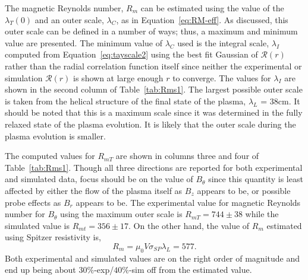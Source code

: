 \documentclass[aps,prl,amsmath,amssymb,reprint,superscriptaddress]{revtex4-1} %
\begin{document}
The magnetic Reynolds number, $R_{m}$ can be estimated using the value of the $\lambda_{T}(0)$ and an outer scale, $\lambda_{C}$, as in Equation~\ref{eq:RM-eff}. As discussed, this outer scale can be defined in a number of ways; thus, a maximum and minimum value are presented. The minimum value of $\lambda_{C}$ used is the integral scale, $\lambda_{I}$ computed from Equation~\ref{eq:tayscale2} using the best fit Gaussian of $\mathcal{R}(r)$ rather than the radial correlation function itself since neither the experimental or simulation $\mathcal{R}(r)$ is shown at large enough $r$ to converge. The values for $\lambda_{I}$ are shown in the second column of Table~\ref{tab:Rms1}. The largest possible outer scale is taken from the helical structure of the final state of the plasma, $\lambda_{L}$ = 38cm. It should be noted that this is a maximum scale since it was determined in the fully relaxed state of the plasma evolution. It is likely that the outer scale during the plasma evolution is smaller.

The computed values for $R_{mT}$ are shown in columns three and four of Table~\ref{tab:Rms1}. Though all three directions are reported for both experimental and simulated data, focus should be on the value of $B_{\theta}$ since this quantity is least affected by either the flow of the plasma itself as $B_{z}$ appears to be, or possible probe effects as $B_{r}$ appears to be. The experimental value for magnetic Reynolds number for $B_{\theta}$ using the maximum outer scale is $R_{mT} = 744\pm38$ while the simulated value is $R_{mt} = 356\pm17$. On the other hand, the value of $R_{m}$ estimated using Spitzer resistivity is,
\begin{equation}
R_{m} = \mu_0 V \sigma_{SP} \lambda_L = 577.
\label{eq:spitzer} 
\end{equation}
Both experimental and simulated values are on the right order of magnitude and end up being about $30\%$-exp/$40\%$-sim off from the estimated value.
\end{document}
